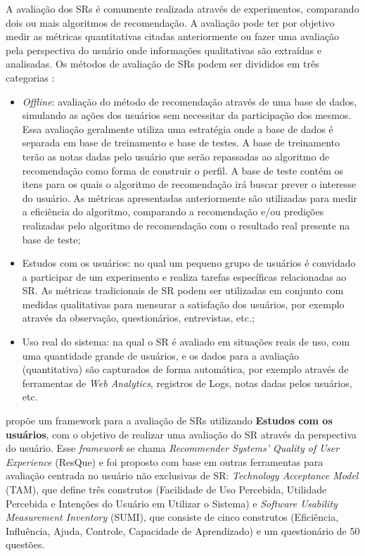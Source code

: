 A avaliação dos SRs é comumente realizada através de experimentos, comparando dois ou mais algoritmos de recomendação. A
avaliação pode ter por objetivo medir as métricas quantitativas citadas anteriormente ou fazer uma avaliação pela
perspectiva do usuário onde informações qualitativas são extraídas e analisadas. Os métodos de avaliação de SRs podem ser
divididos em três categorias \cite{shani2011evaluating}:

\begin{itemize}
\item \textit{Offline}: avaliação do método de recomendação através de uma base de dados, simulando as ações
dos usuários sem necessitar da participação dos mesmos. Essa avaliação geralmente utiliza uma estratégia onde a base de dados
é separada em base de treinamento e base de testes. A base de treinamento terão as notas dadas pelo usuário que serão
repassadas ao algoritmo de recomendação como forma de construir o perfil. A base de teste contém os itens para os
quais o algoritmo de recomendação irá buscar prever o interesse do usuário. As métricas apresentadas anteriormente são
utilizadas para medir a eficiência do algoritmo, comparando a recomendação e/ou predições realizadas pelo algoritmo de
recomendação com o resultado real presente na base de teste;
\item Estudos com os usuários: no qual um pequeno grupo de usuários é convidado a participar de um experimento e realiza
tarefas específicas relacionadas ao SR. As métricas tradicionais de SR podem ser utilizadas em conjunto com medidas
qualitativas para mensurar a satisfação dos usuários, por exemplo através da observação, questionários, entrevistas, etc.;
\item Uso real do sistema: na qual o SR é avaliado em situações reais de uso, com uma quantidade grande de usuários, e
os dados para a avaliação (quantitativa) são capturados de forma automática, por exemplo através de ferramentas de
\textit{Web Analytics}, registros de Logs, notas dadas pelos usuários, etc.
\end{itemize}

 propõe um framework para a avaliação de SRs utilizando \textbf{Estudos com os usuários}, com o objetivo
de realizar uma avaliação do SR através da perspectiva do usuário. Esse \textit{framework} se chama \textit{Recommender
Systems' Quality of User Experience}  (ResQue) e foi proposto com base em outras ferramentas para avaliação centrada no
usuário não exclusivas de SR: \textit{Technology Acceptance Model} (TAM), que define três construtos (Facilidade de Uso
Percebida, Utilidade Percebida e Intenções do Usuário em Utilizar o Sistema) e \textit{Software Usability Measurement
Inventory} (SUMI), que consiste de cinco construtos (Eficiência, Influência, Ajuda, Controle, Capacidade de Aprendizado)
e um questionário de 50 questões.

